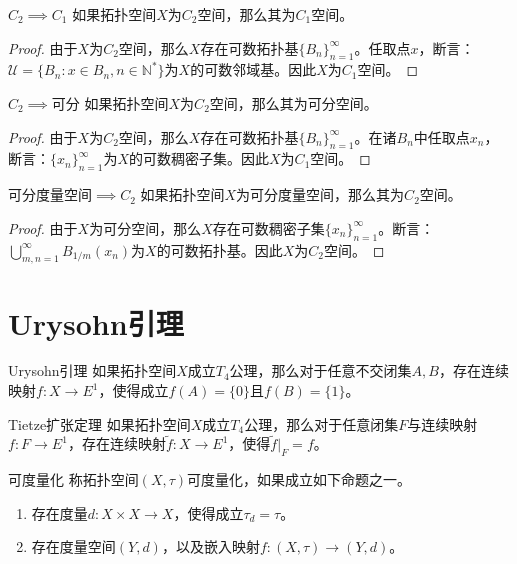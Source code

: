\documentclass[lang = cn, scheme = chinese, thmcnt = section, usesamecnt]{elegantbook}
\newcommand{\N}{\mathbb{N}}            %
\newcommand{\dis}{\displaystyle}
\begin{document}
\begin{theorem}{$C_2\implies C_1$}
	如果拓扑空间$X$为$C_2$空间，那么其为$C_1$空间。
\end{theorem}

\begin{proof}
	由于$X$为$C_2$空间，那么$X$存在可数拓扑基$\{B_n\}_{n=1}^{\infty}$。任取点$x$，断言：$\mathscr{U}=\{ B_n:x\in B_n,n\in\N^* \}$为$X$的可数邻域基。因此$X$为$C_1$空间。
\end{proof}

\begin{theorem}{$C_2\implies$可分}
	如果拓扑空间$X$为$C_2$空间，那么其为可分空间。
\end{theorem}

\begin{proof}
	由于$X$为$C_2$空间，那么$X$存在可数拓扑基$\{B_n\}_{n=1}^{\infty}$。在诸$B_n$中任取点$x_n$，断言：$\{x_n\}_{n=1}^{\infty}$为$X$的可数稠密子集。因此$X$为$C_1$空间。
\end{proof}

\begin{theorem}{可分度量空间$\implies C_2$}
	如果拓扑空间$X$为可分度量空间，那么其为$C_2$空间。
\end{theorem}

\begin{proof}
	由于$X$为可分空间，那么$X$存在可数稠密子集$\{x_n\}_{n=1}^{\infty}$。断言：$\dis \bigcup_{m,n=1}^{\infty}B_{1/m}(x_n)$为$X$的可数拓扑基。因此$X$为$C_2$空间。
\end{proof}

\section{Urysohn引理}

\begin{theorem}{Urysohn引理}
	如果拓扑空间$X$成立$T_4$公理，那么对于任意不交闭集$A,B$，存在连续映射$f:X\to E^1$，使得成立$f(A)=\{0\}$且$f(B)=\{1\}$。
\end{theorem}

\begin{theorem}{Tietze扩张定理}
	如果拓扑空间$X$成立$T_4$公理，那么对于任意闭集$F$与连续映射$f:F\to E^1$，存在连续映射$\tilde{f}:X\to E^1$，使得$\tilde{f}|_F=f$。
\end{theorem}

\begin{definition}{可度量化}
	称拓扑空间$(X,\tau)$可度量化，如果成立如下命题之一。
	\begin{enumerate}
		\item 存在度量$d:X\times X\to X$，使得成立$\tau_d=\tau$。
		\item 存在度量空间$(Y,d)$，以及嵌入映射$f:(X,\tau)\to(Y,d)$。
	\end{enumerate}
\end{definition}
\end{document}

